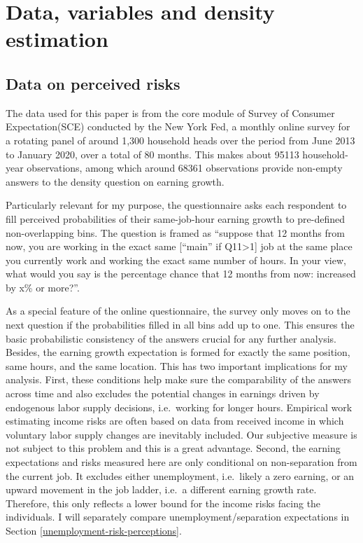 
    \hypertarget{data-variables-and-density-estimation}{%
\section{Data, variables and density
estimation}\label{data-variables-and-density-estimation}}

\hypertarget{data}{%
\subsection{Data on perceived risks}\label{data}}

The data used for this paper is from the core module of Survey of
Consumer Expectation(SCE) conducted by the New York Fed, a monthly
online survey for a rotating panel of around 1,300 household heads over
the period from June 2013 to January 2020, over a total of 80 months.
This makes about 95113 household-year observations, among which around
68361 observations provide non-empty answers to the density question on
earning growth.

Particularly relevant for my purpose, the questionnaire asks each
respondent to fill perceived probabilities of their same-job-hour
earning growth to pre-defined non-overlapping bins. The question is
framed as ``suppose that 12 months from now, you are working in the
exact same {[}``main'' if Q11\textgreater1{]} job at the same place you
currently work and working the exact same number of hours. In your view,
what would you say is the percentage chance that 12 months from now:
increased by x\% or more?''.

As a special feature of the online questionnaire, the survey only moves
on to the next question if the probabilities filled in all bins add up
to one. This ensures the basic probabilistic consistency of the answers
crucial for any further analysis. Besides, the earning growth
expectation is formed for exactly the same position, same hours, and the
same location. This has two important implications for my analysis.
First, these conditions help make sure the comparability of the answers
across time and also excludes the potential changes in earnings driven
by endogenous labor supply decisions, i.e.~working for longer hours.
Empirical work estimating income risks are often based on data from
received income in which voluntary labor supply changes are inevitably
included. Our subjective measure is not subject to this problem and this
is a great advantage. Second, the earning expectations and risks
measured here are only conditional on non-separation from the current
job. It excludes either unemployment, i.e.~likely a zero earning, or an
upward movement in the job ladder, i.e.~a different earning growth rate.
Therefore, this only reflects a lower bound for the income risks facing the individuals. I will separately compare unemployment/separation expectations in Section \ref{unemployment-risk-perceptions}. 

